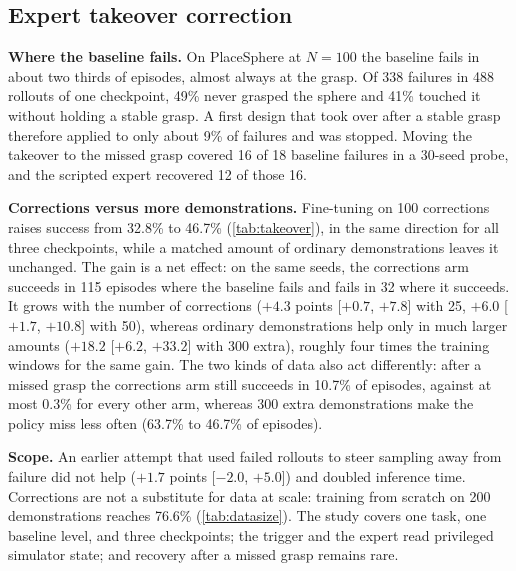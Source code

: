 \subsection{Expert takeover correction}
\label{sec:takeover}

\textbf{Where the baseline fails.} On PlaceSphere at $N=100$ the baseline
fails in about two thirds of episodes, almost always at the grasp. Of 338
failures in 488 rollouts of one checkpoint, 49\% never grasped the sphere and
41\% touched it without holding a stable grasp. A first design that took over after a stable
grasp therefore applied to only about 9\% of failures and was stopped. Moving the takeover to the missed grasp
covered 16 of 18 baseline failures in a 30-seed probe, and the scripted expert
recovered 12 of those 16.

\textbf{Corrections versus more demonstrations.} Fine-tuning on 100
corrections raises success from 32.8\% to 46.7\% (\cref{tab:takeover}), in the
same direction for all three checkpoints, while a matched amount of ordinary
demonstrations leaves it unchanged. The gain is a net effect: on the same
seeds, the corrections arm succeeds in 115 episodes where the baseline fails
and fails in 32 where it succeeds. It grows with the number of
corrections ($+4.3$ points [$+0.7$, $+7.8$] with 25, $+6.0$ [$+1.7$, $+10.8$]
with 50), whereas ordinary demonstrations help only in much larger amounts
($+18.2$ [$+6.2$, $+33.2$] with 300 extra), roughly four times the training
windows for the same gain. The two kinds of data also act differently: after
a missed grasp the corrections arm still succeeds in 10.7\% of episodes,
against at most 0.3\% for every other arm, whereas 300 extra demonstrations
make the policy miss less often (63.7\% to 46.7\% of episodes).

\textbf{Scope.} An earlier attempt that used failed rollouts to steer sampling
away from failure did not help ($+1.7$ points [$-2.0$, $+5.0$]) and doubled
inference time. Corrections are not a substitute for data at scale: training
from scratch on 200 demonstrations reaches 76.6\% (\cref{tab:datasize}). The
study covers one task, one baseline level, and three checkpoints; the trigger
and the expert read privileged simulator state; and recovery after a missed
grasp remains rare.

